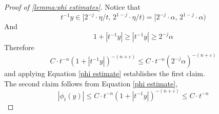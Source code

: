 \documentclass[../../main.tex]{subfiles}
\begin{document}
\begin{proof}[Proof of \ref{lemma:phi estimates}]
    Notice that\[t^{-1}y\in[2^{-j}\cdot \eta/t,\,2^{1-j}\cdot \eta/t)=[2^{-j}\cdot \alpha,\,2^{1-j}\cdot \alpha)\]
    And\[1+|t^{-1}y|\geq |t^{-1}y|\geq 2^{-j}\alpha\]
    Therefore\[C\cdot t^{-n}(1+|t^{-1}y|)^{-(n+\varepsilon)}\leq C\cdot t^{-n}(2^{-j}\alpha)^{-(n+\varepsilon)}\]
    and applying Equation \eqref{phi estimate} establishes the first claim.\\

    The second claim follows from Equation \eqref{phi estimate}, \[|\phi_t(y)|\leq C\cdot t^{-n}(1+|t^{-1}y|)^{-(n+\varepsilon)}\leq C\cdot t^{-n}\]
\end{proof}

    

\end{document}
